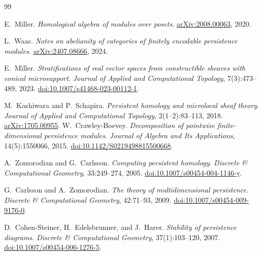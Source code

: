\documentclass{article}
\newcommand{\<}{\langle}
\renewcommand{\>}{\rangle}
\theoremstyle{definition}
\theoremstyle{remark}
\begin{document}
	
	\begin{thebibliography}{99}
		
		E.~Miller.
		\newblock \emph{Homological algebra of modules over posets}.
		\newblock \href{https://arxiv.org/abs/2008.00063}{arXiv:2008.00063}, 2020.
		
		

		L.~Waas.
		\newblock \emph{Notes on abelianity of categories of finitely encodable persistence modules}.
		\newblock \href{https://arxiv.org/abs/2407.08666}{arXiv:2407.08666}, 2024.

		E.~Miller.
		\newblock \emph{Stratifications of real vector spaces from constructible sheaves with conical microsupport}.
		\newblock \emph{Journal of Applied and Computational Topology}, 7(3):473--489, 2023.
		\newblock \href{https://doi.org/10.1007/s41468-023-00112-1}{doi:10.1007/s41468-023-00112-1}.

		M.~Kashiwara and P.~Schapira.
		\newblock \emph{Persistent homology and microlocal sheaf theory}.
		\newblock \emph{Journal of Applied and Computational Topology}, 2(1--2):83--113, 2018.
		\newblock \href{https://arxiv.org/abs/1705.00955}{arXiv:1705.00955}.
		W.~Crawley-Boevey.
		\newblock \emph{Decomposition of pointwise finite-dimensional persistence
			modules}.
		\newblock \emph{Journal of Algebra and Its Applications}, 14(5):1550066, 2015.
		\newblock \href{https://doi.org/10.1142/S0219498815500668}{doi:10.1142/S0219498815500668}.
		
		A.~Zomorodian and G.~Carlsson.
		\newblock \emph{Computing persistent homology}.
		\newblock \emph{Discrete \& Computational Geometry}, 33:249--274, 2005.
		\newblock \href{https://doi.org/10.1007/s00454-004-1146-y}{doi:10.1007/s00454-004-1146-y}.
		
		G.~Carlsson and A.~Zomorodian.
		\newblock \emph{The theory of multidimensional persistence}.
		\newblock \emph{Discrete \& Computational Geometry}, 42:71--93, 2009.
		\newblock \href{https://doi.org/10.1007/s00454-009-9176-0}{doi:10.1007/s00454-009-9176-0}.
		
		D.~Cohen-Steiner, H.~Edelsbrunner, and J.~Harer.
		\newblock \emph{Stability of persistence diagrams}.
		\newblock \emph{Discrete \& Computational Geometry}, 37(1):103--120, 2007.
		\newblock \href{https://doi.org/10.1007/s00454-006-1276-5}{doi:10.1007/s00454-006-1276-5}.
		

\end{thebibliography}
\end{document}
